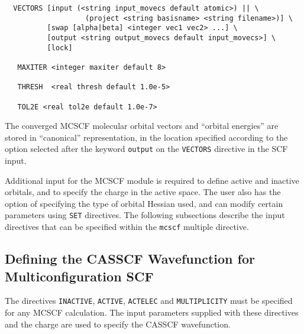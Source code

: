 \begin{verbatim}
  VECTORS [input (<string input_movecs default atomic>) || \
                   (project <string basisname> <string filename>)] \
          [swap [alpha|beta] <integer vec1 vec2> ...] \
          [output <string output_movecs default input_movecs>] \
          [lock]

   MAXITER <integer maxiter default 8>

   THRESH  <real thresh default 1.0e-5>

   TOL2E <real tol2e default 1.0e-7>
\end{verbatim}

The converged MCSCF molecular orbital vectors and ``orbital energies'' are 
stored in ``canonical'' representation, in the location specified according
to the option selected after the keyword \verb+output+ on the \verb+VECTORS+
directive in the SCF input.
  

Additional input for the MCSCF module is required to define active and
inactive orbitals, and to specify the charge in the active space.  The
user also has the option of specifying the type of orbital Hessian used, 
and can modify certain parameters using \verb+SET+ directives.  The following
subsections describe the input directives that can be specified within
the \verb+mcscf+ multiple directive.




\subsection{Defining the CASSCF Wavefunction for Multiconfiguration SCF}

The directives \verb+INACTIVE+, \verb+ACTIVE+, \verb+ACTELEC+ and
\verb+MULTIPLICITY+ must be specified for any MCSCF calculation.  The
input parameters supplied with these directives and the charge are used to 
specify the CASSCF wavefunction.

